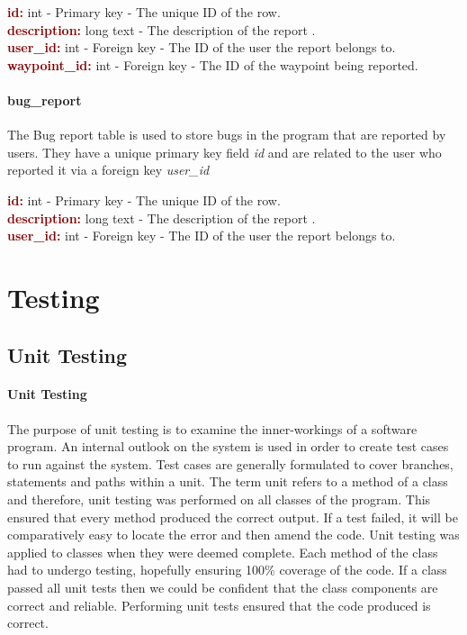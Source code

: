 \documentclass[11pt,a4paper]{report}
\begin{document}
\textbf{\textcolor{Maroon}{id:}} int - Primary key - The unique ID of the row. \\
\textbf{\textcolor{Maroon}{description:}} long text -  The description of the report .\\
\textbf{\textcolor{Maroon}{user\_id:}} int - Foreign key - The ID of the user the report belongs to.\\
\textbf{\textcolor{Maroon}{waypoint\_id:}} int - Foreign key - The ID of the waypoint being reported.

\subsubsection{bug\_report}
The Bug report table is used to store bugs in the program that are reported by users. They have a unique primary key field \textit{id} and are related to the user who reported it via a foreign key \textit{user\_id}

\textbf{\textcolor{Maroon}{id:}} int - Primary key - The unique ID of the row. \\
\textbf{\textcolor{Maroon}{description:}} long text -  The description of the report .\\
\textbf{\textcolor{Maroon}{user\_id:}} int - Foreign key - The ID of the user the report belongs to.\\

\chapter{Testing}
\label{sec:testing}
\newpage

\section{Unit Testing}
\label{sec:unit-testint}
\subsubsection{Unit Testing} 
The purpose of unit testing is to examine the inner-workings of a software program. An internal outlook on the system is used in order to create test cases to run against the system. Test cases are generally formulated to cover branches, statements and paths within a unit. The term unit refers to a method of a class and therefore, unit testing was performed on all classes of the program. This ensured that every method produced the correct output. If a test failed, it will be comparatively easy to locate the error and then amend the code. Unit testing was applied to classes when they were deemed complete. Each method of the class had to undergo testing, hopefully ensuring 100\% coverage of the code. If a class passed all unit tests then we could be confident that the class components are correct and reliable. Performing unit tests ensured that the code produced is correct.
\end{document}
